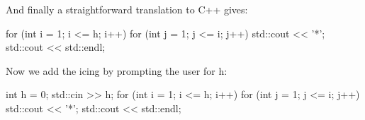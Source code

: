
And finally a straightforward translation to C++ gives:
\begin{console}
for (int i = 1; i <= h; i++)
{   
    for (int j = 1; j <= i; j++)
    {
        std::cout << '*';
    }
    std::cout << std::endl;
}
\end{console}
Now we add the icing by prompting the user for h:
\begin{console}
int h = 0;
std::cin >> h;
for (int i = 1; i <= h; i++)
{   
    for (int j = 1; j <= i; j++)
    {   
        std::cout << '*';
    }
std::cout << std::endl;
}
\end{console}

